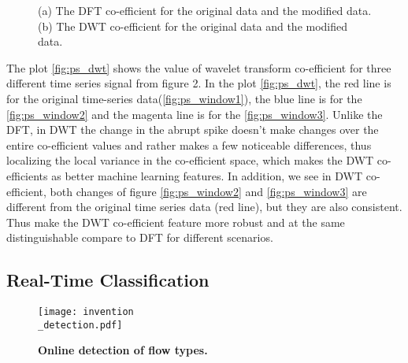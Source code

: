 \documentclass[12pt]{amsart}
\begin{document}
\begin{figure*}[htb]
\centering
{}
\caption{ (a) The DFT co-efficient for the original data and the modified data. (b) The DWT co-efficient for the original data and the modified data. }
\end{figure*}

The plot \ref{fig:ps_dwt} shows the value of wavelet transform co-efficient for three different time series signal from figure 2. In the plot \ref{fig:ps_dwt}, the red line is for the original time-series data(\ref{fig:ps_window1}), the blue line is for the \ref{fig:ps_window2} and the magenta line is for the \ref{fig:ps_window3}. Unlike the DFT, in DWT the change in the abrupt spike doesn't make changes over the entire co-efficient values and rather makes a few noticeable differences, thus localizing the local variance in the co-efficient space, which makes the DWT co-efficients as better machine learning features. In addition, we see in DWT co-efficient, both changes of figure \ref{fig:ps_window2} and \ref{fig:ps_window3} are different from the original time series data (red line), but they are also consistent. Thus make the DWT co-efficient feature more robust and at the same distinguishable compare to DFT for different scenarios.









\subsection{Real-Time Classification}

\begin{figure*}
	\centering
	\texttt{[image: invention\\\_detection.pdf]}
	\caption{\textbf{Online detection of flow types.}} 
	\label{fig:system}
\end{figure*}
\end{document}
